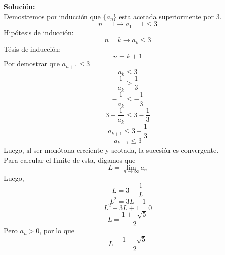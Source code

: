 \documentclass[12pt]{article}
\newenvironment{solucion}
{\begin{mdframed}[backgroundcolor=black!10]
		{\bf Solución:}\\
	}
	{
	\end{mdframed}
}
\newenvironment{preguntas}
{\begin{enumerate}\itemsep12pt
	}
	{
	\end{enumerate}
}
\newcommand{\ra}{\rightarrow}
\begin{document}
\begin{preguntas}
\begin{solucion}
Demostremos por inducción que $\{a_n\}$ esta acotada superiormente por 3. \\
$$n = 1 \ra a_1 = 1 \leq 3$$
Hipótesis de inducción:
$$n = k \ra a_k \leq 3$$
Tésis de inducción:
$$n = k+1$$
Por demostrar que $a_{n+1} \leq 3$
$$a_k \leq 3$$
$$\dfrac{1}{a_k} \geq \dfrac{1}{3}$$
$$-\dfrac{1}{a_k} \leq -\dfrac{1}{3}$$
$$3-\dfrac{1}{a_k} \leq 3-\dfrac{1}{3}$$
$$a_{k+1} \leq 3-\dfrac{1}{3}$$
$$a_{k+1} \leq 3$$
Luego, al ser monótona creciente y acotada, la sucesión es convergente.\\

Para calcular el límite de esta, digamos que
$$L = \lim\limits_{n \ra \infty} a_n$$
Luego,
$$L = 3 - \dfrac{1}{L}$$
$$L^2 = 3L - 1$$
$$L^2 - 3L + 1 = 0$$
$$L = \dfrac{1\pm\ \sqrt[]{5}}{2}$$
Pero $a_n > 0$, por lo que
$$L = \dfrac{1 + \sqrt[]{5}}{2}$$

\end{solucion}
\end{preguntas}
\end{document}

